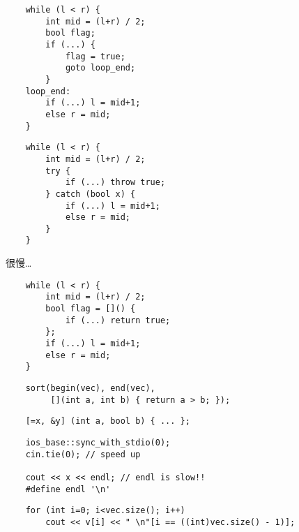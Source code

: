 \documentclass[standalone]{beamer}
\begin{document}
\begin{frame}[fragile]{}
  \begin{verbatim}
    while (l < r) {
        int mid = (l+r) / 2;
        bool flag;
        if (...) {
            flag = true;
            goto loop_end;
        }
    loop_end:
        if (...) l = mid+1;
        else r = mid;
    }
  \end{verbatim}
\end{frame}

\begin{frame}[fragile]{}
  \begin{verbatim}
    while (l < r) {
        int mid = (l+r) / 2;
        try {
            if (...) throw true;
        } catch (bool x) {
            if (...) l = mid+1;
            else r = mid;
        }
    }
  \end{verbatim}
  \pause
  很慢…
\end{frame}

\begin{frame}[fragile]{}
  \begin{verbatim}
    while (l < r) {
        int mid = (l+r) / 2;
        bool flag = []() {
            if (...) return true;
        };
        if (...) l = mid+1;
        else r = mid;
    }
  \end{verbatim}
\end{frame}

\begin{frame}[fragile]{}
  \begin{verbatim}
    sort(begin(vec), end(vec),
         [](int a, int b) { return a > b; });
  \end{verbatim}

  \begin{verbatim}
    [=x, &y] (int a, bool b) { ... };
  \end{verbatim}
\end{frame}

\begin{frame}[fragile]{}
  \begin{verbatim}
    ios_base::sync_with_stdio(0);
    cin.tie(0); // speed up

    cout << x << endl; // endl is slow!!
    #define endl '\n'
  \end{verbatim}

  \begin{verbatim}
    for (int i=0; i<vec.size(); i++)
        cout << v[i] << " \n"[i == ((int)vec.size() - 1)];
  \end{verbatim}
\end{frame}
\end{document}
